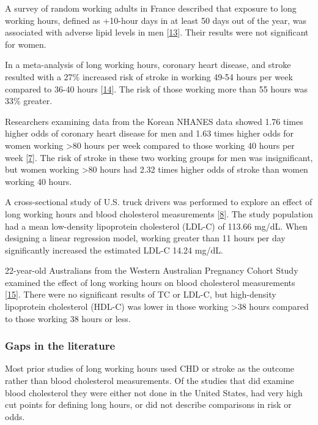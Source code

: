\documentclass[]{elsarticle} %
\begin{document}
A survey of random working adults in France described that exposure to
long working hours, defined as +10-hour days in at least 50 days out of
the year, was associated with adverse lipid levels in men
{[}\protect\hyperlink{ref-virtanen2019}{13}{]}. Their results were not
significant for women.

In a meta-analysis of long working hours, coronary heart disease, and
stroke resulted with a 27\% increased risk of stroke in working 49-54
hours per week compared to 36-40 hours
{[}\protect\hyperlink{ref-kivimaki2015}{14}{]}. The risk of those
working more than 55 hours was 33\% greater.

Researchers examining data from the Korean NHANES data showed 1.76 times
higher odds of coronary heart disease for men and 1.63 times higher odds
for women working \textgreater80 hours per week compared to those
working 40 hours per week {[}\protect\hyperlink{ref-lee2016}{7}{]}. The
risk of stroke in these two working groups for men was insignificant,
but women working \textgreater80 hours had 2.32 times higher odds of
stroke than women working 40 hours.

A cross-sectional study of U.S. truck drivers was performed to explore
an effect of long working hours and blood cholesterol measurements
{[}\protect\hyperlink{ref-lemke2017}{8}{]}. The study population had a
mean low-density lipoprotein cholesterol (LDL-C) of 113.66 mg/dL. When
designing a linear regression model, working greater than 11 hours per
day significantly increased the estimated LDL-C 14.24 mg/dL.

22-year-old Australians from the Western Australian Pregnancy Cohort
Study examined the effect of long working hours on blood cholesterol
measurements {[}\protect\hyperlink{ref-reynolds2018}{15}{]}. There were
no significant results of TC or LDL-C, but high-density lipoprotein
cholesterol (HDL-C) was lower in those working \textgreater38 hours
compared to those working 38 hours or less.

\hypertarget{gaps-in-the-literature}{%
\subsubsection{Gaps in the literature}\label{gaps-in-the-literature}}

Most prior studies of long working hours used CHD or stroke as the
outcome rather than blood cholesterol measurements. Of the studies that
did examine blood cholesterol they were either not done in the United
States, had very high cut points for defining long hours, or did not
describe comparisons in risk or odds.
\end{document}
